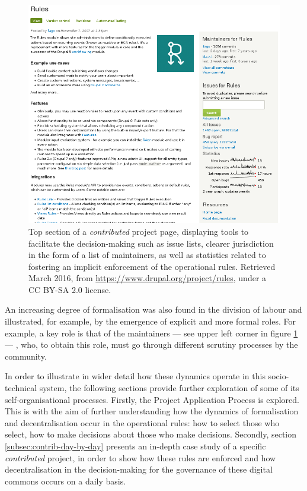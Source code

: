 \begin{figure}[H]
   \centering
\includegraphics[width=1.0\textwidth]{img/online/project_page_01.png}
 \caption[Project page for a \textit{contributed} Drupal project]%
 {Top section of a \textit{contributed} project page, displaying tools to facilitate the decision-making such as issue lists, clearer jurisdiction in the form of a list of maintainers, as well as statistics related to fostering an implicit enforcement of the operational rules. Retrieved  March 2016, from \url{https://www.drupal.org/project/rules}, under a CC BY-SA 2.0 license.}
\label{project_page_top}
\end{figure}

An increasing degree of formalisation was also found in the division of labour and illustrated, for example, by the emergence of explicit and more formal roles. For example, a key role is that of the maintainers --- see upper left corner in figure \ref{project_page_top} --- , who, to obtain this role, must go through different scrutiny processes by the community.

In order to illustrate in wider detail how these dynamics operate in this socio-technical system, the following sections provide further exploration of some of its self-organisational processes. Firstly, the Project Application Process is explored. This is with the aim of further understanding how the dynamics of formalisation and decentralisation occur in the operational rules: how to select those who select, how to make decisions about those who make decisions. Secondly, section \ref{subsec:contrib-day-by-day} presents an in-depth case study of a specific \textit{contributed} project, in order to show how these rules are enforced and how decentralisation in the decision-making for the governance of these digital commons occurs on a daily basis.

